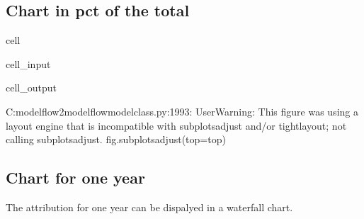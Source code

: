 \documentclass[letterpaper,10pt,english]{jupyterBook}
\begin{document}
\subsection{Chart in pct of the total}
\label{\detokenize{content/howto/attribution/Attribution background:chart-in-pct-of-the-total}}
\begin{sphinxuseclass}{cell}\begin{sphinxVerbatimInput}

\begin{sphinxuseclass}{cell_input}
\begin{sphinxVerbatim}[commandchars=\\\{\}]
\end{sphinxVerbatim}

\end{sphinxuseclass}\end{sphinxVerbatimInput}
\begin{sphinxVerbatimOutput}

\begin{sphinxuseclass}{cell_output}
\begin{sphinxVerbatim}[commandchars=\\\{\}]
C:\PYGZbs{}modelflow2\PYGZbs{}modelflow\PYGZbs{}modelclass.py:1993: UserWarning: This figure was using a layout engine that is incompatible with subplots\PYGZus{}adjust and/or tight\PYGZus{}layout; not calling subplots\PYGZus{}adjust.
  fig.subplots\PYGZus{}adjust(top=top)
\end{sphinxVerbatim}

\noindent{}

\end{sphinxuseclass}\end{sphinxVerbatimOutput}

\end{sphinxuseclass}

\subsection{Chart for one year}
\label{\detokenize{content/howto/attribution/Attribution background:chart-for-one-year}}
\sphinxAtStartPar
The attribution for one year can be dispalyed in a waterfall chart.
\end{document}
